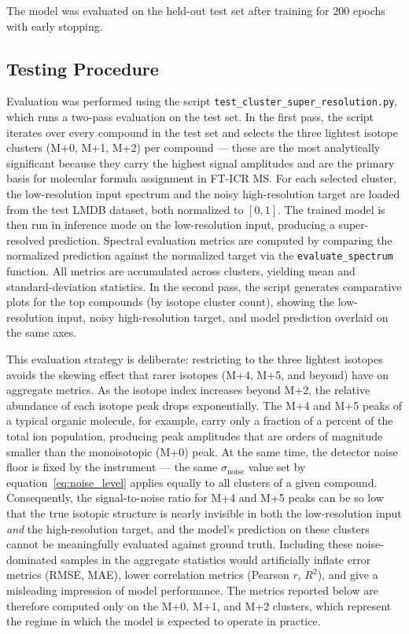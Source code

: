 \documentclass[12pt,a4paper]{report}
\begin{document}
The model was evaluated on the held-out test set after training for $200$ epochs with early stopping.

\subsection{Testing Procedure}

Evaluation was performed using the script \texttt{test\_cluster\_super\_resolution.py}, which runs a two-pass evaluation on the test set.  In the first pass, the script iterates over every compound in the test set and selects the three lightest isotope clusters (M+0, M+1, M+2) per compound — these are the most analytically significant because they carry the highest signal amplitudes and are the primary basis for molecular formula assignment in FT-ICR MS.  For each selected cluster, the low-resolution input spectrum and the noisy high-resolution target are loaded from the test LMDB dataset, both normalized to $[0,1]$.  The trained model is then run in inference mode on the low-resolution input, producing a super-resolved prediction.  Spectral evaluation metrics are computed by comparing the normalized prediction against the normalized target via the \texttt{evaluate\_spectrum} function.  All metrics are accumulated across clusters, yielding mean and standard-deviation statistics.  In the second pass, the script generates comparative plots for the top compounds (by isotope cluster count), showing the low-resolution input, noisy high-resolution target, and model prediction overlaid on the same axes.

This evaluation strategy is deliberate: restricting to the three lightest isotopes avoids the skewing effect that rarer isotopes (M+4, M+5, and beyond) have on aggregate metrics.  As the isotope index increases beyond M+2, the relative abundance of each isotope peak drops exponentially.  The M+4 and M+5 peaks of a typical organic molecule, for example, carry only a fraction of a percent of the total ion population, producing peak amplitudes that are orders of magnitude smaller than the monoisotopic (M+0) peak.  At the same time, the detector noise floor is fixed by the instrument — the same $\sigma_{\mathrm{noise}}$ value set by equation~\ref{eq:noise_level} applies equally to all clusters of a given compound.  Consequently, the signal-to-noise ratio for M+4 and M+5 peaks can be so low that the true isotopic structure is nearly invisible in both the low-resolution input \textit{and} the high-resolution target, and the model's prediction on these clusters cannot be meaningfully evaluated against ground truth.  Including these noise-dominated samples in the aggregate statistics would artificially inflate error metrics (RMSE, MAE), lower correlation metrics (Pearson $r$, $R^2$), and give a misleading impression of model performance.  The metrics reported below are therefore computed only on the M+0, M+1, and M+2 clusters, which represent the regime in which the model is expected to operate in practice.
\end{document}
